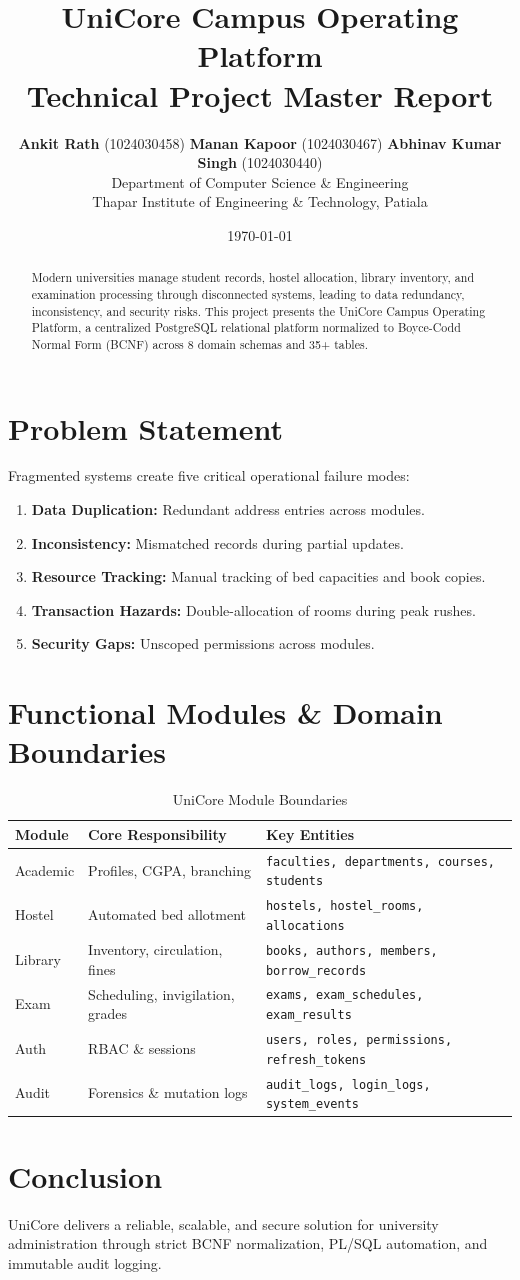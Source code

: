 \documentclass[11pt,a4paper]{article}
\title{\textbf{UniCore Campus Operating Platform}\\ \Large Technical Project Master Report}
\author{\textbf{Ankit Rath} (1024030458) \quad \textbf{Manan Kapoor} (1024030467) \quad \textbf{Abhinav Kumar Singh} (1024030440)\\
\small Department of Computer Science \& Engineering\\
\small Thapar Institute of Engineering \& Technology, Patiala}
\date{\today}
\begin{document}
\maketitle

\begin{abstract}
Modern universities manage student records, hostel allocation, library inventory, and examination processing through disconnected systems, leading to data redundancy, inconsistency, and security risks. This project presents the UniCore Campus Operating Platform, a centralized PostgreSQL relational platform normalized to Boyce-Codd Normal Form (BCNF) across 8 domain schemas and 35+ tables.
\end{abstract}

\section{Problem Statement}
Fragmented systems create five critical operational failure modes:
\begin{enumerate}
    \item \textbf{Data Duplication:} Redundant address entries across modules.
    \item \textbf{Inconsistency:} Mismatched records during partial updates.
    \item \textbf{Resource Tracking:} Manual tracking of bed capacities and book copies.
    \item \textbf{Transaction Hazards:} Double-allocation of rooms during peak rushes.
    \item \textbf{Security Gaps:} Unscoped permissions across modules.
\end{enumerate}

\section{Functional Modules \& Domain Boundaries}
\begin{table}[h!]
\centering
\begin{tabular}{lll}
\toprule
\textbf{Module} & \textbf{Core Responsibility} & \textbf{Key Entities} \\
\midrule
Academic & Profiles, CGPA, branching & \texttt{faculties, departments, courses, students} \\
Hostel & Automated bed allotment & \texttt{hostels, hostel\_rooms, allocations} \\
Library & Inventory, circulation, fines & \texttt{books, authors, members, borrow\_records} \\
Exam & Scheduling, invigilation, grades & \texttt{exams, exam\_schedules, exam\_results} \\
Auth & RBAC \& sessions & \texttt{users, roles, permissions, refresh\_tokens} \\
Audit & Forensics \& mutation logs & \texttt{audit\_logs, login\_logs, system\_events} \\
\bottomrule
\end{tabular}
\caption{UniCore Module Boundaries}
\end{table}

\section{Conclusion}
UniCore delivers a reliable, scalable, and secure solution for university administration through strict BCNF normalization, PL/SQL automation, and immutable audit logging.
\end{document}
